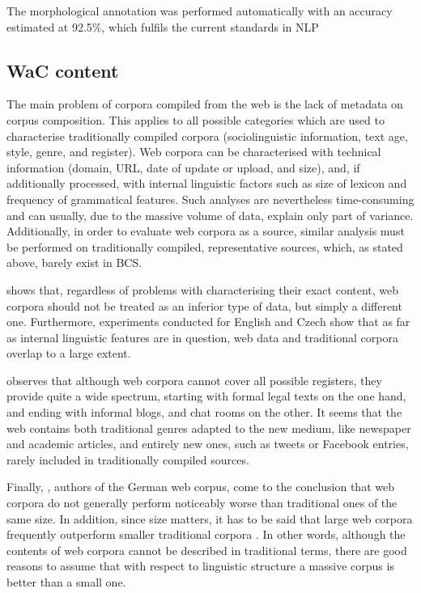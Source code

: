 The morphological annotation was performed automatically with an accuracy estimated at 92.5\%, which fulfils the current standards in NLP \citep[4269]{LKAJ16}

\subsection{WaC content}
\label{WaC content}
The main problem of corpora compiled from the web is the lack of metadata on corpus composition. This applies to all possible categories which are used to characterise traditionally compiled corpora (sociolinguistic information, text age, style, genre, and register). Web corpora can be characterised with technical information (domain, URL, date of update or upload, and size), and, if additionally processed, with internal linguistic factors such as size of lexicon and frequency of grammatical features. Such analyses are nevertheless time-consuming and can usually, due to the massive volume of data, explain only part of variance. Additionally, in order to evaluate web corpora as a source, similar analysis must be performed on traditionally compiled, representative sources, which, as stated above, barely exist in BCS.

\citet{Benko17} shows that, regardless of problems with characterising their exact content, web corpora should not be treated as an inferior type of data, but simply a different one. Furthermore, experiments conducted for English \citep{BiberEgbert16} and Czech \citep{Cvrcek18} show that as far as internal linguistic features are in question, web data and traditional corpora overlap to a large extent.

\citet[62f]{Gato14} observes that although web corpora cannot cover all possible registers, they provide quite a wide spectrum, starting with formal legal texts on the one hand, and ending with informal blogs, and chat rooms on the other. It seems that the web contains both traditional genres adapted to the new medium, like newspaper and academic articles, and entirely new ones, such as tweets or Facebook entries, rarely included in traditionally compiled sources.

Finally, \citet[106]{SchafferBildhauer13}, authors of the German web corpus, come to the conclusion that web corpora do not generally perform noticeably worse than traditional ones of the same size. In addition, since size matters, it has to be said that large web corpora frequently outperform smaller traditional corpora \citep[106]{SchafferBildhauer13}. In other words, although the contents of web corpora cannot be described in traditional terms, there are good reasons to assume that with respect to linguistic structure a massive corpus is better than a small one.

